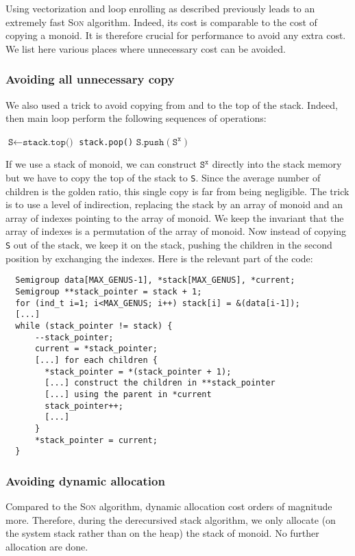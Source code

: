 \documentclass[reqno,11pt]{amsart}
\theoremstyle{plain}
\theoremstyle{definition}
\renewcommand{\tt}[1]{\texttt{#1}}
\begin{document}
Using vectorization and loop enrolling as described previously leads to an
extremely fast \textsc{Son} algorithm. Indeed, its cost is comparable to the cost
of copying a monoid. It is therefore crucial for performance to avoid any
extra cost. We list here various places where unnecessary cost can be avoided.



\subsubsection*{Avoiding all unnecessary copy} We also used a trick to avoid
copying from and to the top of the stack. Indeed, then main loop perform the
following sequences of operations:

{\small
\begin{algorithmic}
  \State $\tt{S} \gets \tt{stack.top()}$
  \State \tt{stack.pop()}
  \For{all children $\tt{S}^\tt{x}$ of \tt{S}}
  \State $\tt{S.push}(\tt{S}^\tt{x})$
  \EndFor
\end{algorithmic}
}

If we use a stack of monoid, we can construct $\tt{S}^\tt{x}$ directly into
the stack memory but we have to copy the top of the stack to \tt{S}. Since the
average number of children is the golden ratio, this single copy is far from
being negligible. The trick is to use a level of indirection, replacing the
stack by an array of monoid and an array of indexes pointing to the array of
monoid. We keep the invariant that the array of indexes is a permutation of
the array of monoid. Now instead of copying \tt{S} out of the stack, we keep
it on the stack, pushing the children in the second position by exchanging the
indexes. Here is the relevant part of the code:

{\small
\begin{verbatim}
  Semigroup data[MAX_GENUS-1], *stack[MAX_GENUS], *current;
  Semigroup **stack_pointer = stack + 1;
  for (ind_t i=1; i<MAX_GENUS; i++) stack[i] = &(data[i-1]);
  [...]
  while (stack_pointer != stack) {
      --stack_pointer;
      current = *stack_pointer;
      [...] for each children {
        *stack_pointer = *(stack_pointer + 1);
        [...] construct the children in **stack_pointer
        [...] using the parent in *current
        stack_pointer++;
        [...]
      }
      *stack_pointer = current;
  }
\end{verbatim}
}

\subsubsection*{Avoiding dynamic allocation} Compared to the \textsc{Son}
algorithm, dynamic allocation cost orders of magnitude more. Therefore, during
the derecursived stack algorithm, we only allocate (on the system stack rather
than on the heap) the stack of monoid. No further allocation are done.
\end{document}
